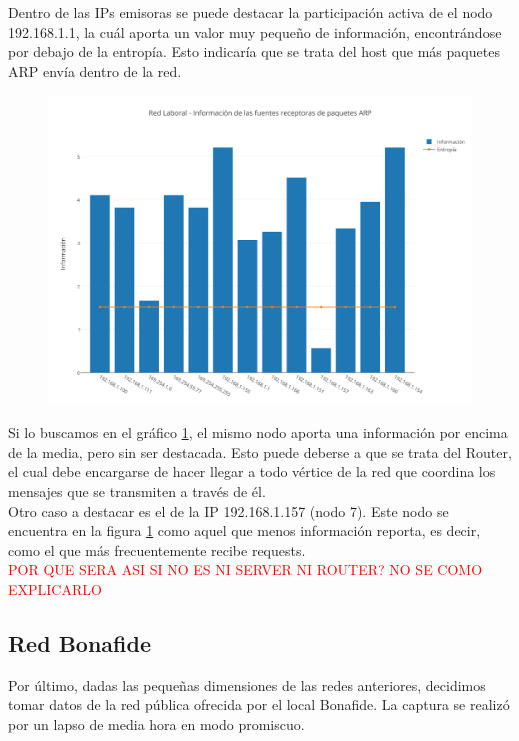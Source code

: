 Dentro de las IPs emisoras se puede destacar la participaci\'on activa de el nodo 192.168.1.1, la cu\'al aporta un valor muy pequeño de informaci\'on, encontr\'andose por debajo de la entrop\'ia. Esto indicar\'ia que se trata del host que m\'as paquetes ARP env\'ia dentro de la red. \\

\begin{figure}[h!]
    \centering                                                       
    \includegraphics[width=400pt]{img/RedLaboralFuentesReceptorasARP}
    \caption{}
    \label{laboralReceptoras}
\end{figure}

Si lo buscamos en el gr\'afico \ref{laboralReceptoras}, el mismo nodo aporta una informaci\'on por encima de la media, pero sin ser destacada. Esto puede deberse a que se trata del Router, el cual debe encargarse de hacer llegar a todo v\'ertice de la red que coordina los mensajes que se transmiten a trav\'es de \'el.\\
Otro caso a destacar es el de la IP 192.168.1.157 (nodo 7). Este nodo se encuentra en la figura \ref{laboralReceptoras} como aquel que menos informaci\'on reporta, es decir, como el que m\'as frecuentemente recibe requests. \\ \textcolor{red}{POR QUE SERA ASI SI NO ES NI SERVER NI ROUTER? NO SE COMO EXPLICARLO}


\newpage
\subsection{Red Bonafide}
 Por \'ultimo, dadas las peque\~nas dimensiones de las redes anteriores, decidimos tomar datos de la red p\'ublica ofrecida por el local Bonafide. La captura se realiz\'o por un lapso de media hora en modo promiscuo.

